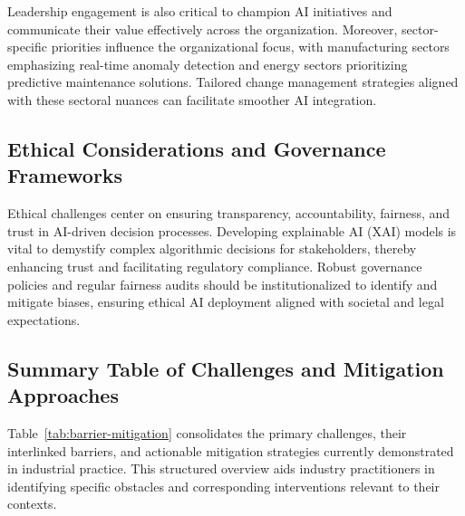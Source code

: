 \documentclass[sigconf]{acmart}
\begin{document}
Leadership engagement is also critical to champion AI initiatives and communicate their value effectively across the organization. Moreover, sector-specific priorities influence the organizational focus, with manufacturing sectors emphasizing real-time anomaly detection and energy sectors prioritizing predictive maintenance solutions. Tailored change management strategies aligned with these sectoral nuances can facilitate smoother AI integration.

\subsection{Ethical Considerations and Governance Frameworks}

Ethical challenges center on ensuring transparency, accountability, fairness, and trust in AI-driven decision processes. Developing explainable AI (XAI) models is vital to demystify complex algorithmic decisions for stakeholders, thereby enhancing trust and facilitating regulatory compliance. Robust governance policies and regular fairness audits should be institutionalized to identify and mitigate biases, ensuring ethical AI deployment aligned with societal and legal expectations.

\subsection{Summary Table of Challenges and Mitigation Approaches}

Table~\ref{tab:barrier-mitigation} consolidates the primary challenges, their interlinked barriers, and actionable mitigation strategies currently demonstrated in industrial practice. This structured overview aids industry practitioners in identifying specific obstacles and corresponding interventions relevant to their contexts.
\end{document}
